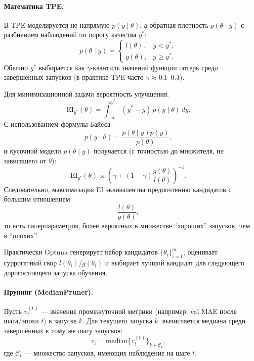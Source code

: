 \documentclass[11pt]{article}
\begin{document}
\paragraph{Математика TPE.}
В TPE моделируется не напрямую $p(y\mid \theta)$, а обратная плотность $p(\theta\mid y)$ с разбиением наблюдений по порогу качества $y^*$:
\begin{equation*}
p(\theta\mid y)=
\begin{cases}
l(\theta), & y < y^*, \\
 g(\theta), & y \ge y^*.
\end{cases}
\end{equation*}
Обычно $y^*$ выбирается как $\gamma$-квантиль значений функции потерь среди завершённых запусков (в практике TPE часто $\gamma\approx 0.1\text{--}0.3$).

Для минимизационной задачи вероятность улучшения:
\begin{equation*}
\mathrm{EI}_{y^*}(\theta)=\int_{-\infty}^{y^*}(y^*-y)\,p(y\mid\theta)\,dy.
\end{equation*}
С использованием формулы Байеса
\begin{equation*}
p(y\mid\theta)=\frac{p(\theta\mid y)p(y)}{p(\theta)},
\end{equation*}
и кусочной модели $p(\theta\mid y)$ получается (с точностью до множителя, не зависящего от $\theta$):
\begin{equation*}
\mathrm{EI}_{y^*}(\theta) \propto
\left(\gamma + (1-\gamma)\frac{g(\theta)}{l(\theta)}\right)^{-1}.
\end{equation*}
Следовательно, максимизация EI эквивалентна предпочтению кандидатов с большим отношением
\begin{equation*}
\frac{l(\theta)}{g(\theta)},
\end{equation*}
то есть гиперпараметров, более вероятных в множестве ``хороших'' запусков, чем в ``плохих''.

Практически Optuna генерирует набор кандидатов $\{\theta_i\}_{i=1}^m$, оценивает суррогатный скор $l(\theta_i)/g(\theta_i)$ и выбирает лучший кандидат для следующего дорогостоящего запуска обучения.

\paragraph{Прунинг (MedianPruner).}
Пусть $v_t^{(k)}$ --- значение промежуточной метрики (например, val MAE после шага/эпохи $t$) в запуске $k$. Для текущего запуска $k^\prime$ вычисляется медиана среди завершённых к тому же шагу запусков:
\begin{equation*}
\tilde v_t = \mathrm{median}\{v_t^{(k)}\}_{k \in \mathcal{C}_t},
\end{equation*}
где $\mathcal{C}_t$ --- множество запусков, имеющих наблюдение на шаге $t$.
\end{document}
